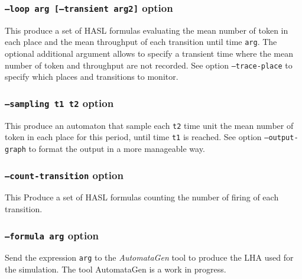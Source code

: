 \documentclass{article}
\begin{document}
\subsubsection{\texttt{--loop arg [--transient arg2]}  option}
This produce a set of HASL formulas evaluating the mean number of 
token in each place and the mean throughput of each transition until time
\texttt{arg}. The optional additional argument allows to specify a transient
time where the mean number of token and throughput are not recorded.
See option \texttt{--trace-place} to specify which places and transitions 
to monitor.

\subsubsection{\texttt{--sampling t1 t2} option}
This produce an automaton that sample each \texttt{t2} time unit the
mean number of token in each place for this period, until time
\texttt{t1} is reached.  See option \texttt{--output-graph} to format
the output in a more manageable way.

\subsubsection{\texttt{--count-transition} option}
This Produce a set of HASL formulas counting the number of firing of each
transition.

\subsubsection{\texttt{--formula arg} option}
Send the expression \texttt{arg} to the \emph{AutomataGen} tool to produce
the LHA used for the simulation. The tool AutomataGen is a work in progress.
\end{document}
